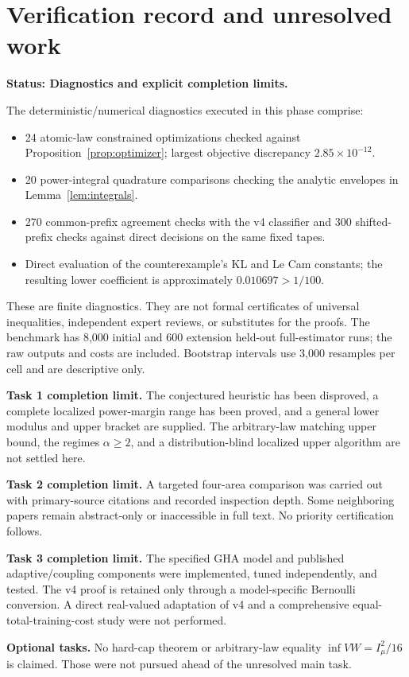 \documentclass[11pt]{article}
\theoremstyle{definition}\newtheorem{conjecture}[theorem]{Conjecture}
\theoremstyle{remark}\newtheorem{remark}[theorem]{Remark}
\newcommand{\status}[1]{\par\smallskip\noindent\textbf{Status: #1.}\par}
\begin{document}
\section{Verification record and unresolved work}
\status{Diagnostics and explicit completion limits}
The deterministic/numerical diagnostics executed in this phase comprise:
\begin{itemize}
\item 24 atomic-law constrained optimizations checked against Proposition~\ref{prop:optimizer}; largest objective discrepancy $2.85\times10^{-12}$.
\item 20 power-integral quadrature comparisons checking the analytic envelopes in Lemma~\ref{lem:integrals}.
\item 270 common-prefix agreement checks with the v4 classifier and 300 shifted-prefix checks against direct decisions on the same fixed tapes.
\item Direct evaluation of the counterexample's KL and Le Cam constants; the resulting lower coefficient is approximately $0.010697>1/100$.
\end{itemize}
These are finite diagnostics. They are not formal certificates of universal inequalities, independent expert reviews, or substitutes for the proofs. The benchmark has 8,000 initial and 600 extension held-out full-estimator runs; the raw outputs and costs are included. Bootstrap intervals use 3,000 resamples per cell and are descriptive only.

\textbf{Task 1 completion limit.} The conjectured heuristic has been disproved, a complete localized power-margin range has been proved, and a general lower modulus and upper bracket are supplied. The arbitrary-law matching upper bound, the regimes $\alpha\ge2$, and a distribution-blind localized upper algorithm are not settled here.

\textbf{Task 2 completion limit.} A targeted four-area comparison was carried out with primary-source citations and recorded inspection depth. Some neighboring papers remain abstract-only or inaccessible in full text. No priority certification follows.

\textbf{Task 3 completion limit.} The specified GHA model and published adaptive/coupling components were implemented, tuned independently, and tested. The v4 proof is retained only through a model-specific Bernoulli conversion. A direct real-valued adaptation of v4 and a comprehensive equal-total-training-cost study were not performed.

\textbf{Optional tasks.} No hard-cap theorem or arbitrary-law equality $\inf VW=I_\mu^2/16$ is claimed. Those were not pursued ahead of the unresolved main task.
\end{document}
